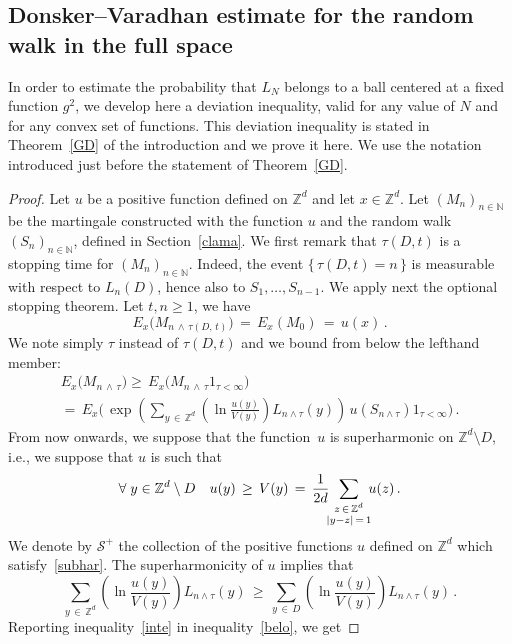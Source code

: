 \documentclass[10pt]{amsart}
\theoremstyle{definition}\newtheorem{defi}[theo]{Definition}\newtheorem{rema}[theo]{Remark}\newtheorem{exam}[theo]{Example}\newtheorem{exem}[theo]{Example}\newtheorem{nota}[theo]{Notation}
\newcommand{\tatop}[2]{\genfrac{}{}{0pt}{1}{#1}{#2}}
\newcommand*\Zd {{\mathbb Z^d}}
\newcommand*\N {{\mathbb N}}
\renewcommand{\N}{\mathbb{N}}
\let\oldforall\forall
\renewcommand*{\forall}{\mathrel{\oldforall}}
\begin{document}
\subsection{Donsker--Varadhan estimate for the random walk in the full space}\label{devi}
In order to estimate the probability that $L_N$ belongs to a ball centered at a fixed function $g^2$, we develop here a deviation inequality, valid for any value of $N$ and for any convex set of functions. This deviation inequality is stated in Theorem~\ref{GD} of the introduction and we prove it here. We use the notation introduced just before the statement of Theorem~\ref{GD}.

\begin{proof}
Let $u$ be a positive function defined on $\Zd$ and let $x\in\Zd$.
Let $(M_n)_{n\in\N}$ be the martingale constructed with the function $u$ and the random walk $(S_n)_{n\in \N}$, defined in Section~\ref{clama}. We first remark that ${\tau(D,t)}$ is a stopping time for $(M_n)_{n\in\N}$. Indeed, the event $\{\,\tau(D,t)=n\,\}$ is measurable with respect to $L_n(D)$, hence also to $S_1,\dots,S_{n-1}$. We apply next the optional stopping theorem. Let $t,n\geq 1$, we have
\[
E_x\big(
M_{n\,\wedge\,\tau(D,\,t)}\big)
\,=\,E_x(M_0)\,=\,u(x)\,.
\]
We note simply $\tau$ instead of $\tau(D,t)$ and we bound from below the lefthand member:
\begin{multline}\label{belo}
E_x\big(M_{n\,\wedge\,\tau}\big) \geq\, E_x\Big(M_{n\,\wedge\,\tau} 1_{\tau<\infty}
\Big)\\
=\, E_x\Bigg(
\,\exp\left(\sum_{y\,\in\,\Zd}\left(\ln
\frac{u(y)}{V(y)}\right)L_{n\wedge\tau}(y)\right)\, u(S_{n\wedge\tau}) 1_{\tau<\infty}
\Bigg)
\,.
\end{multline}
From now onwards, we suppose that the function~$u$ is superharmonic on $\Zd\setminus D$, i.e., we suppose that $u$ is such that
\begin{equation}\label{subhar}
\forall y\in\Zd\setminus D\quad{u(y)}
\,\geq\, {V(y)}
\,=\,
\frac{1}{2d}
\!\!\!
\sum_{\tatop{z\,\in\,\Zd}{|y-z|\,=\,1}}
\!\!\! u(z)\,.
\end{equation}
We denote by $\mathcal{S^+}$ the collection of the positive functions $u$ defined on $\Zd$ which satisfy~\eqref{subhar}. The superharmonicity of $u$ implies that
\begin{equation}\label{inte}
\sum_{y\,\in\,\Zd}\left(\ln
\frac{u(y)}{V(y)}\right)L_{n\wedge\tau}(y)
\,\geq\,
\sum_{y\,\in\,D}\left(\ln
\frac{u(y)}{V(y)}\right)L_{n\wedge\tau}(y)\,.
\end{equation}
Reporting inequality~\eqref{inte} in inequality~\eqref{belo}, we get

\end{proof}
\end{document}
